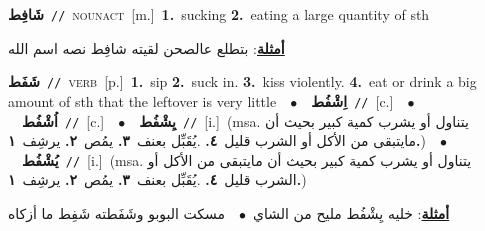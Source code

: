 \documentclass[10pt,a4paper,twoside]{article} %
\begin{document}
\begin{multicols}{2}
{\setlength\topsep{0pt}\textbf{\foreignlanguage{arabic}{شَافِط}}\ {\color{gray}\texttt{//}\color{black}}\ \textsc{noun\textunderscore act}\ [m.]\ \textbf{1.}~sucking  \textbf{2.}~eating a large quantity of sth\  \begin{flushright}\color{gray}\foreignlanguage{arabic}{\textbf{\underline{\foreignlanguage{arabic}{أمثلة}}}: بتطلع عالصحن لقيته شافِط نصه اسم الله}\end{flushright}\color{black}} \vspace{2mm}

{\setlength\topsep{0pt}\textbf{\foreignlanguage{arabic}{شَفَط}}\ {\color{gray}\texttt{//}\color{black}}\ \textsc{verb}\ [p.]\ \textbf{1.}~sip  \textbf{2.}~suck in.  \textbf{3.}~kiss violently.  \textbf{4.}~eat or drink a big amount of sth that the leftover is very little\ \ $\bullet$\ \ \setlength\topsep{0pt}\textbf{\foreignlanguage{arabic}{اِشْفُط}}\ {\color{gray}\texttt{//}\color{black}}\ [c.]\ \ $\bullet$\ \ \setlength\topsep{0pt}\textbf{\foreignlanguage{arabic}{اُشْفُط}}\ {\color{gray}\texttt{//}\color{black}}\ [c.]\ \ $\bullet$\ \ \setlength\topsep{0pt}\textbf{\foreignlanguage{arabic}{يِشْفُط}}\ {\color{gray}\texttt{//}\color{black}}\ [i.]\ \color{gray}(msa. \foreignlanguage{arabic}{يتناول أو يشرب كمية كبير بحيث أن مايتبقى من الأكل أو الشرب قليل}~\foreignlanguage{arabic}{\textbf{٤.}}  .\foreignlanguage{arabic}{يُقَبِّل بعنف}~\foreignlanguage{arabic}{\textbf{٣.}}  \foreignlanguage{arabic}{يمُص}~\foreignlanguage{arabic}{\textbf{٢.}}  \foreignlanguage{arabic}{يرشِف}~\foreignlanguage{arabic}{\textbf{١.}})\color{black}\ \ $\bullet$\ \ \setlength\topsep{0pt}\textbf{\foreignlanguage{arabic}{يُشْفُط}}\ {\color{gray}\texttt{//}\color{black}}\ [i.]\ \color{gray}(msa. \foreignlanguage{arabic}{يتناول أو يشرب كمية كبير بحيث أن مايتبقى من الأكل أو الشرب قليل}~\foreignlanguage{arabic}{\textbf{٤.}}  .\foreignlanguage{arabic}{يُقَبِّل بعنف}~\foreignlanguage{arabic}{\textbf{٣.}}  \foreignlanguage{arabic}{يمُص}~\foreignlanguage{arabic}{\textbf{٢.}}  \foreignlanguage{arabic}{يرشِف}~\foreignlanguage{arabic}{\textbf{١.}})\color{black}\  \begin{flushright}\color{gray}\foreignlanguage{arabic}{\textbf{\underline{\foreignlanguage{arabic}{أمثلة}}}: خليه يِشْفُط مليح من الشاي\ $\bullet$\ \  مسكت البوبو وشَفَطته شَفِط ما أزكاه}\end{flushright}\color{black}} \vspace{2mm}


\end{multicols}
\end{document}
